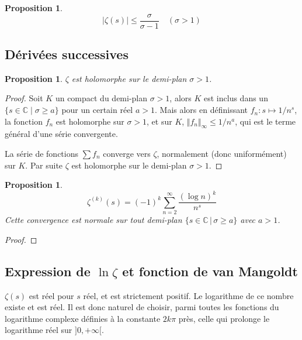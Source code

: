 \documentclass[french]{report}
\newtheorem{proposition}[theorem]{Proposition}
\begin{document}
\begin{proposition}\label{eq:zeta-majoration-facile}
  \[ |\zeta(s)|\leq\frac{\sigma}{\sigma-1}\quad(\sigma>1) \]
\end{proposition}

\subsection{Dérivées successives}

\begin{proposition}
  $\zeta$ est holomorphe sur le demi-plan $\sigma > 1$.
\end{proposition}

\begin{proof}
  Soit $K$ un compact du demi-plan $\sigma > 1$, alors $K$ est inclus dans un $\{ s\in\mathbb{C} \mid \sigma \geq a \}$ pour un certain réel $a > 1$. Mais alors en définissant $f_n: s \mapsto 1 / n^s$, la fonction $f_n$ est holomorphe sur $\sigma > 1$, et sur $K$, $\Vert{f_n}\Vert_\infty \leq 1 / n^a$, qui est le terme général d'une série convergente.
  
  La série de fonctions $\sum f_n$ converge vers $\zeta$, normalement (donc uniformément) sur $K$. Par suite $\zeta$ est holomorphe sur le demi-plan $\sigma > 1$.
\end{proof}

\begin{proposition}
  \[ \zeta^{(k)}(s) = (-1)^k\sum_{n=2}^\infty\frac{(\log n)^k}{n^s} \]
  Cette convergence est normale sur tout demi-plan $\{s\in\mathbb{C}\,|\,\sigma\geq a\}$ avec $a>1$.
\end{proposition}

\begin{proof}
\end{proof}

\subsection{Expression de $\ln\zeta$ et fonction de van Mangoldt}

$\zeta(s)$ est réel pour $s$ réel, et est strictement positif. Le logarithme de ce nombre existe et est réel. Il est donc naturel de choisir, parmi toutes les fonctions du logarithme complexe définies à la constante $2k\pi$ près, celle qui prolonge le logarithme réel sur $]0,+\infty[$.
\end{document}
